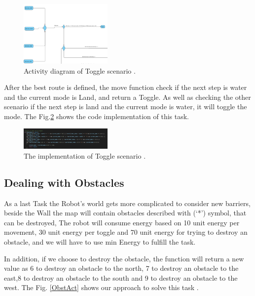 \documentclass[10pt,journal,compsoc]{IEEEtran}
\begin{document}
\begin{figure}[!h]
	
	\centering
	\includegraphics[width=0.4\textwidth]{Toggle.png}
	\caption{\label{ToggleAct}Activity diagram of Toggle scenario  .}
	
\end{figure}


After the best route is defined, the move function check if the next step is water and the current mode is Land, and return a Toggle. As well as checking the other scenario if the next step is land and the current mode is water, it will toggle the mode. The Fig.\ref{ToggleCode} shows the code implementation of this task.


\begin{figure}[!h]
	
	\centering
	\includegraphics[width=0.4\textwidth]{ToggleCode.png}
	\caption{\label{ToggleCode}The implementation of Toggle scenario  .}
	
\end{figure}


\subsection{ Dealing with Obstacles}

As a last Task the Robot's world gets more complicated to consider new barriers, beside the Wall the map will contain  obstacles described with  (‘*’) symbol, that can be destroyed, The robot will consume  energy based on  10 unit energy per movement,  30 unit energy per toggle and  70 unit energy for trying to destroy an obstacle, and we will have to use min Energy to fulfill the task. 

In addition, if we choose to destroy the  obstacle, the function will return a new value as  6 to  destroy an obstacle to the north, 7 to destroy an obstacle to the east,8 to destroy an obstacle to the south and  9 to destroy an obstacle to the west. The Fig. \ref{ObstAct} shows our approach to solve this task .
\end{document}
